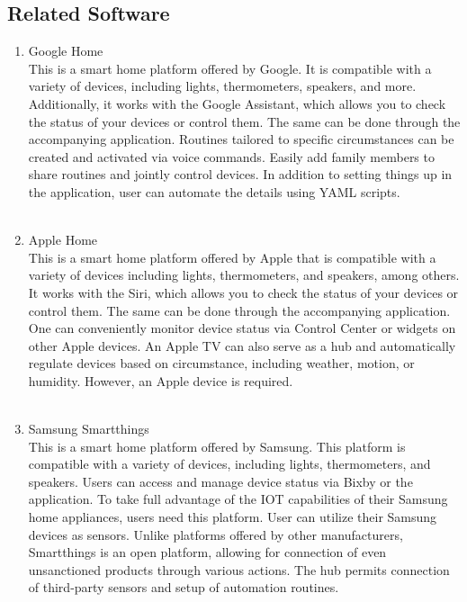 \documentclass[11pt, conference]{IEEEtran}
\begin{document}
\subsection {\large{Related Software}}
    \begin{enumerate}[label=\alph*]
    \item Google Home\\
    This is a smart home platform offered by Google. It is compatible with a variety of devices, including lights, thermometers, speakers, and more. Additionally, it works with the Google Assistant, which allows you to check the status of your devices or control them. The same can be done through the accompanying application. Routines tailored to specific circumstances can be created and activated via voice commands. Easily add family members to share routines and jointly control devices. In addition to setting things up in the application, user can automate the details using YAML scripts.\\\\

    \item Apple Home\\
    This is a smart home platform offered by Apple that is compatible with a variety of devices including lights, thermometers, and speakers, among others. It works with the Siri, which allows you to check the status of your devices or control them. The same can be done through the accompanying application. One can conveniently monitor device status via Control Center or widgets on other Apple devices. An Apple TV can also serve as a hub and automatically regulate devices based on circumstance, including weather, motion, or humidity. However, an Apple device is required.\\\\

    \item Samsung Smartthings\\
    This is a smart home platform offered by Samsung. This platform is compatible with a variety of devices, including lights, thermometers, and speakers. Users can access and manage device status via Bixby or the application. To take full advantage of the IOT capabilities of their Samsung home appliances, users need this platform. User can utilize their Samsung devices as sensors. Unlike platforms offered by other manufacturers, Smartthings is an open platform, allowing for connection of even unsanctioned products through various actions. The hub permits connection of third-party sensors and setup of automation routines.\\\\


\end{enumerate}
\end{document}
